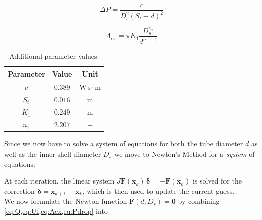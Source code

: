 \documentclass[11pt, a4paper]{article}
\theoremstyle{definition}
\begin{document}
\begin{equation}
    \Delta P = \frac{c}{D_s^2 (S_t - d)^2}
    \label{eq:Pdrop}
\end{equation}

\begin{equation}
    A_{ex} = \pi K_1 \frac{D_s^{n_1}}{d^{n_1-1}}
    \label{eq:Aex}
\end{equation}

\begin{table}[H]
  \centering
  \begin{tabular}{@{}ccc@{}}
    \toprule
    Parameter & Value & Unit \\
    \midrule
    $c$   & $0.389$ & $\mathrm{W\,s\cdot m}$ \\[6pt]
    $S_t$ & $0.016$ & $\mathrm{m}$ \\[6pt]
    $K_1$ & $0.249$ & $\mathrm{m}$ \\[6pt]
    $n_1$ & $2.207$ & $-$ \\[6pt]
    \bottomrule
  \end{tabular}
  \caption{Additional parameter values.}
  \label{tab:params2}
\end{table}
Since we now have to solve a system of equations for both the tube diameter $d$ as well as the inner shell diameter $D_s$ we move to Newton's Method for a \textit{system} of equations:
\begin{algorithm}[H]
  \caption{Newton's method -- system}
  \label{alg:newton_system}
  \begin{algorithmic}
    \ENDWHILE
  \end{algorithmic}
\end{algorithm}

At each iteration, the linear system
$J\mathbf{F}(\mathbf{x}_k)\,\boldsymbol{\delta} = -\mathbf{F}(\mathbf{x}_k)$
is solved for the correction $\boldsymbol{\delta} = \mathbf{x}_{k+1} - \mathbf{x}_k$, which is then used to update the current guess. \\
We now formulate the Newton function $\mathbf{F}(d, D_s) = \mathbf{0}$ by
combining \cref{eq:Q,eq:Uf,eq:Aex,eq:Pdrop} into
\end{document}

